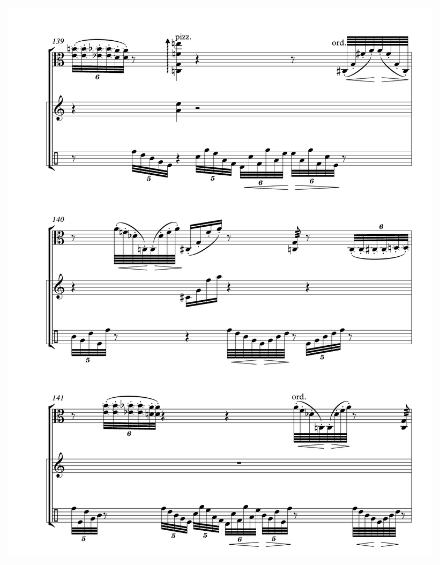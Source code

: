 \begin{figure}[htbp]
    \centering
	\includegraphics[width=6.5in]{figures/Viola_Percussion_20.pdf}
\end{figure}

